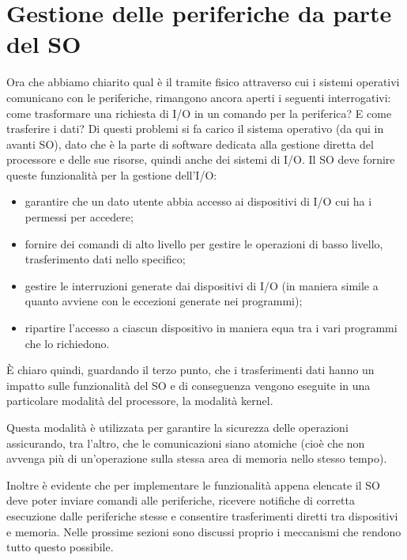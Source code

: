\documentclass[class=book, crop=false, oneside]{standalone}
\begin{document}
\section{Gestione delle periferiche da parte del SO}
Ora che abbiamo chiarito qual è il tramite fisico attraverso cui i sistemi operativi comunicano con le periferiche, rimangono ancora aperti i seguenti interrogativi: come trasformare una richiesta di I/O in un comando per la periferica? E come trasferire i dati? Di questi problemi si fa carico il sistema operativo (da qui in avanti SO), dato che è la parte di software dedicata alla gestione diretta del processore e delle sue risorse, quindi anche dei sistemi di I/O. Il SO deve fornire queste funzionalità per la gestione dell'I/O:
\begin{itemize}
	\item garantire che un dato utente abbia accesso ai dispositivi di I/O cui ha i permessi per accedere;
	\item fornire dei comandi di alto livello per gestire le operazioni di basso livello, trasferimento dati nello specifico;
	\item gestire le interruzioni generate dai dispositivi di I/O (in maniera simile a quanto avviene con le eccezioni generate nei programmi);
	\item ripartire l'accesso a ciascun dispositivo in maniera equa tra i vari programmi che lo richiedono.
\end{itemize}
È chiaro quindi, guardando il terzo punto, che i trasferimenti dati hanno un impatto sulle funzionalità del SO e di conseguenza vengono eseguite in una particolare modalità del processore, la modalità kernel.

Questa modalità è utilizzata per garantire la sicurezza delle operazioni assicurando, tra l'altro, che le comunicazioni siano atomiche (cioè che non avvenga più di un'operazione sulla stessa area di memoria nello stesso tempo).

Inoltre è evidente che per implementare le funzionalità appena elencate il SO deve poter inviare comandi alle periferiche, ricevere notifiche di corretta esecuzione dalle periferiche stesse e consentire trasferimenti diretti tra dispositivi e memoria. Nelle prossime sezioni sono discussi proprio i meccanismi che rendono tutto questo possibile.
\end{document}
